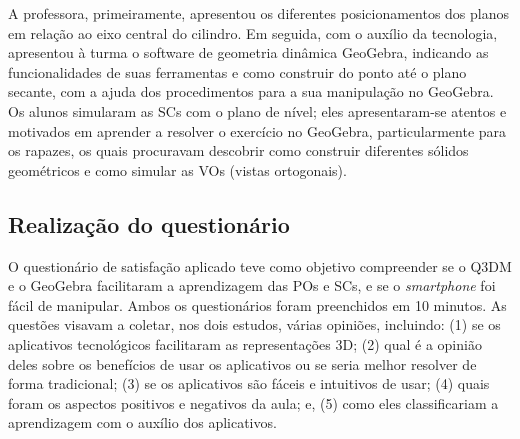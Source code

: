 A professora, primeiramente, apresentou os diferentes posicionamentos
dos planos em relação ao eixo central do cilindro. Em seguida, com o
auxílio da tecnologia, apresentou à turma o software de geometria
dinâmica GeoGebra, indicando as funcionalidades de suas ferramentas e
como construir do ponto até o plano secante, com a ajuda dos
procedimentos para a sua manipulação no GeoGebra. Os alunos simularam as
SCs com o plano de nível; eles apresentaram-se atentos e motivados em
aprender a resolver o exercício no GeoGebra, particularmente para os
rapazes, os quais procuravam descobrir como construir diferentes sólidos
geométricos e como simular as VOs (vistas ortogonais).

\subsection{Realização do questionário}\label{sub-sec-Realização do questionário}

O questionário de satisfação aplicado teve como objetivo compreender se
o Q3DM e o GeoGebra facilitaram a aprendizagem das POs e SCs, e se o
\textit{smartphone} foi fácil de manipular. Ambos os questionários foram
preenchidos em 10 minutos. As questões visavam a coletar, nos dois
estudos, várias opiniões, incluindo: (1) se os aplicativos tecnológicos
facilitaram as representações 3D; (2) qual é a opinião deles sobre os
benefícios de usar os aplicativos ou se seria melhor resolver de forma
tradicional; (3) se os aplicativos são fáceis e intuitivos de usar; (4)
quais foram os aspectos positivos e negativos da aula; e, (5) como eles
classificariam a aprendizagem com o auxílio dos aplicativos.
